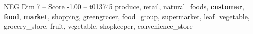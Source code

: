 \begin{textsample}{NEG Dim 7 – Score -1.00 – t013745}  \label{ex:f7_neg_013}
produce, retail, natural\_foods, \textbf{customer}, \textbf{food}, \textbf{market}, shopping, greengrocer, food\_group, supermarket, leaf\_vegetable, grocery\_store, fruit, vegetable, shopkeeper, convenience\_store

\end{textsample}
